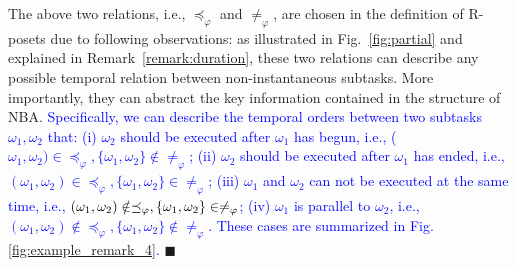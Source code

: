 \begin{remark}\label{remark:partial-order-motivation}
The above two relations, i.e., $\preceq_\varphi$ and $\neq_\varphi$,
are chosen in the definition of R-posets due to following observations:
as illustrated in Fig.~\ref{fig:partial} and explained in Remark~\ref{remark:duration},
these two relations can describe any possible temporal relation
between non-instantaneous subtasks.
More importantly,
they can abstract the key information contained in the structure of NBA.
\textcolor{blue}{Specifically, we can describe the temporal orders between two subtasks $\omega_1,\omega_2$ that:
(i) $\omega_2$ should be executed after $\omega_1$ has begun, i.e., ($\omega_1,\omega_2)\in\preceq_{\varphi},\{\omega_1,\omega_2\}\notin\neq_\varphi$;
(ii) $\omega_2$ should be executed after $\omega_1$ has ended, i.e.,
$(\omega_1,\omega_2)\in\preceq_{\varphi}, \{\omega_1,\omega_2\}\in\neq_\varphi$;
(iii) $\omega_1$ and $\omega_2$ can not be executed at the same time,
i.e., $(\omega_1,\omega_2)\\\notin\preceq_\varphi,\{\omega_1,\omega_2\}\in\neq_\varphi$;
(iv) $\omega_1$ is parallel to $\omega_2$, i.e., $(\omega_1,\omega_2)\notin\preceq_\varphi,
\{\omega_1,\omega_2\}\notin\neq_\varphi$.
These cases are summarized in Fig.\ref{fig:example_remark_4}.}
\hfill $\blacksquare$
\end{remark}


